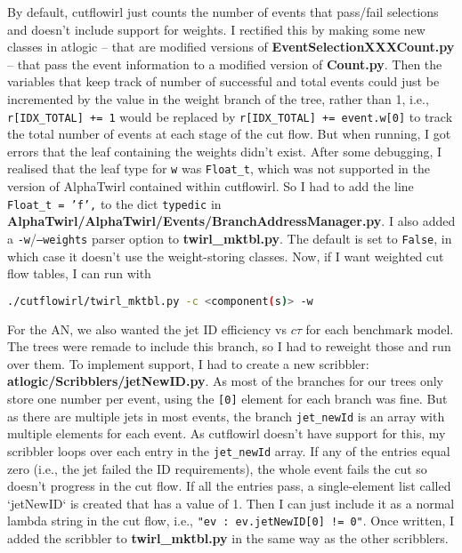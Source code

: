 By default, cutflowirl just counts the number of events that pass/fail selections and doesn't include support for weights. I rectified this by making some new classes in atlogic -- that are modified versions of \textbf{EventSelectionXXXCount.py} -- that pass the event information to a modified version of \textbf{Count.py}. Then the variables that keep track of number of successful and total events could just be incremented by the value in the weight branch of the tree, rather than 1, i.e., \texttt{r[IDX\_TOTAL] += 1} would be replaced by \texttt{r[IDX\_TOTAL] += event.w[0]} to track the total number of events at each stage of the cut flow. But when running, I got errors that the leaf containing the weights didn't exist. After some debugging, I realised that the leaf type for \texttt{w} was \texttt{Float\_t}, which was not supported in the version of AlphaTwirl contained within cutflowirl. So I had to add the line \texttt{Float\_t = 'f',} to the dict \texttt{typedic} in \textbf{AlphaTwirl/AlphaTwirl/Events/BranchAddressManager.py}. I also added a \texttt{-w}/\texttt{--weights} parser option to \textbf{twirl\_mktbl.py}. The default is set to \texttt{False}, in which case it doesn't use the weight-storing classes. Now, if I want weighted cut flow tables, I can run with

\begin{lstlisting}[belowskip=-0.7cm, language=sh, numbers=none]
./cutflowirl/twirl_mktbl.py -c <component(s)> -w
\end{lstlisting}

For the AN, we also wanted the jet ID efficiency vs $c\tau$ for each benchmark model. The trees were remade to include this branch, so I had to reweight those and run over them. To implement support, I had to create a new scribbler: \textbf{atlogic/Scribblers/jetNewID.py}. As most of the branches for our trees only store one number per event, using the \texttt{[0]} element for each branch was fine. But as there are multiple jets in most events, the branch \texttt{jet\_newId} is an array with multiple elements for each event. As cutflowirl doesn't have support for this, my scribbler loops over each entry in the \texttt{jet\_newId} array. If any of the entries equal zero (i.e., the jet failed the ID requirements), the whole event fails the cut so doesn't progress in the cut flow. If all the entries pass, a single-element list called `jetNewID` is created that has a value of 1. Then I can just include it as a normal lambda string in the cut flow, i.e., \texttt{"ev : ev.jetNewID[0] != 0"}. Once written, I added the scribbler to \textbf{twirl\_mktbl.py} in the same way as the other scribblers.

